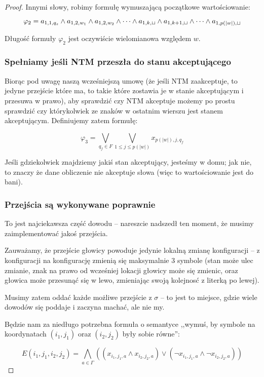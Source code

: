 \begin{proof}
	Innymi słowy, robimy formułę wymuszającą początkowe wartościowanie:

	\[
		\varphi_2 = a_{1,1, q_{s}} \land a_{1,2, w_1} \land a_{1,2, w_2} \land \dots \land a_{1, k, \sqcup} \land a_{1, k+1, \sqcup} \land \dots \land a_{1, p(|w|), \sqcup}
	\]

	Długość formuły \(\varphi_2\) jest oczywiście wielomianowa względem \(w\).

	\subsubsection{Spełniamy jeśli NTM przeszła do stanu akceptującego}
	Biorąc pod uwagę naszą wcześniejszą umowę (że jeśli NTM zaakceptuje, to jedyne przejście które ma, to takie które zostawia je w stanie akceptującym i przesuwa w prawo), aby sprawdzić czy NTM akceptuje możemy po prostu sprawdzić czy którykolwiek ze znaków w ostatnim wierszu jest stanem akceptującym. Definiujemy zatem formułę:

	\[
		\varphi_3 = \bigvee_{q_f \in F } \bigvee_{1 \leq j \leq p(|w|)} x_{p(|w|), j, q_f}
	\]

	Jeśli gdziekolwiek znajdziemy jakiś stan akceptujący, jesteśmy w domu; jak nie, to znaczy że dane obliczenie nie akceptuje słowa (więc to wartościowanie jest do bani).

	\subsubsection{Przejścia są wykonywane poprawnie}
	To jest najciekawsza część dowodu -- nareszcie nadszedł ten moment, że musimy zaimplementować jakoś przejścia.

	Zauważamy, że przejście głowicy powoduje jedynie lokalną zmianę konfiguracji -- z konfiguracji na konfigurację zmienią się maksymalnie 3 symbole (stan może ulec zmianie, znak na prawo od wcześniej lokacji głowicy może się zmienic, oraz głowica może przesunąć się w lewo, zmieniając swoją kolejnosć z literką po lewej).

	Musimy zatem oddać każde możliwe przejście z \( \sigma \) -- to jest to miejsce, gdzie wiele dowodów się poddaje i zaczyna machać, ale nie my.

	Będzie nam za niedługo potrzebna formuła o semantyce ,,wymuś, by symbole na koordynatach \( (i_1, j_1) \) oraz \((i_2, j_2)\) były sobie równe'':

	\[
		E(i_1, j_1, i_2, j_2) = \bigwedge_{a \in \Gamma} ((x_{i_1, j_1, a} \land x_{i_2, j_2, a}) \lor (\neg x_{i_1, j_1, a} \land \neg x_{i_2, j_2, a}) )
	\]


\end{proof}
